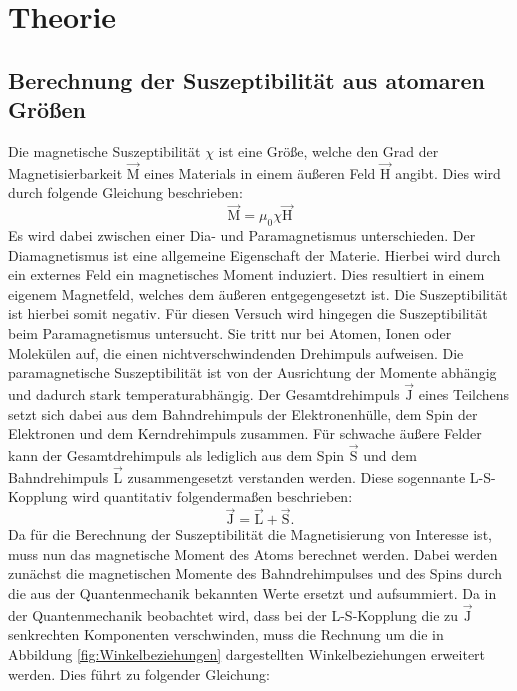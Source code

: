 \section{Theorie}
\label{sec:Theorie}

\subsection{Berechnung der Suszeptibilität aus atomaren Größen}
Die magnetische Suszeptibilität $\chi$ ist eine Größe, welche den Grad der Magnetisierbarkeit $\vec{\text{M}}$ eines Materials in einem äußeren Feld $\vec{\text{H}}$ angibt.
Dies wird durch folgende Gleichung beschrieben:
\begin{equation}
  \vec{\text{M}} = {\mu}_0 \chi \vec{\text{H}}
  \label{eqn:magnetisierung}
\end{equation}
Es wird dabei zwischen einer Dia- und Paramagnetismus unterschieden.
Der Diamagnetismus ist eine allgemeine Eigenschaft der Materie.
Hierbei wird durch ein externes Feld ein magnetisches Moment induziert.
Dies resultiert in einem eigenem Magnetfeld, welches dem äußeren entgegengesetzt ist.
Die Suszeptibilität ist hierbei somit negativ.
Für diesen Versuch wird hingegen die Suszeptibilität beim Paramagnetismus untersucht.
Sie tritt nur bei Atomen, Ionen oder Molekülen auf, die einen nichtverschwindenden Drehimpuls aufweisen.
Die paramagnetische Suszeptibilität ist von der Ausrichtung der Momente abhängig und dadurch stark temperaturabhängig.
Der Gesamtdrehimpuls $\vec{\text{J}}$ eines Teilchens setzt sich dabei aus dem Bahndrehimpuls der Elektronenhülle, dem Spin der Elektronen und dem Kerndrehimpuls zusammen.
Für schwache äußere Felder kann der Gesamtdrehimpuls als lediglich aus dem Spin $\vec{\text{S}}$ und dem Bahndrehimpuls $\vec{\text{L}}$ zusammengesetzt verstanden werden.
Diese sogennante L-S-Kopplung wird quantitativ folgendermaßen beschrieben:
\begin{equation}
  \vec{\text{J}} = \vec{\text{L}} + \vec{\text{S}} .
\end{equation}
Da für die Berechnung der Suszeptibilität die Magnetisierung von Interesse ist, muss nun das magnetische Moment des Atoms berechnet werden.
Dabei werden zunächst die magnetischen Momente des Bahndrehimpulses und des Spins durch die aus der Quantenmechanik bekannten Werte ersetzt und aufsummiert.
Da in der Quantenmechanik beobachtet wird, dass bei der L-S-Kopplung die zu $\vec{\text{J}}$ senkrechten Komponenten verschwinden, muss die Rechnung um die in
Abbildung \ref{fig:Winkelbeziehungen} dargestellten Winkelbeziehungen erweitert werden. Dies führt zu folgender Gleichung:
